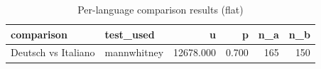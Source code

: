 \begin{table}[ht]
\centering
\begin{tabular}{llrrrr}
\toprule
comparison & test_used & u & p & n_a & n_b \\
\midrule
Deutsch vs Italiano & mannwhitney & 12678.000 & 0.700 & 165 & 150 \\
\bottomrule
\end{tabular}
\caption{Per-language comparison results (flat)}\n\label{tab:perlang}\n\end{table}
